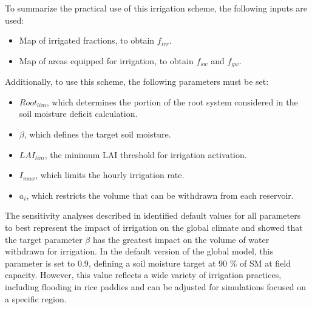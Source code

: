 To summarize the practical use of this irrigation scheme, the following inputs are used:
\begin{itemize}
    \item Map of irrigated fractions, to obtain $f_{irr}$.
    \item Map of areas equipped for irrigation, to obtain $f_{sw}$ and $f_{gw}$.
\end{itemize}

Additionally, to use this scheme, the following parameters must be set:
\begin{itemize}
    \item $Root_{lim}$, which determines the portion of the root system considered in the soil moisture deficit calculation.
    \item $\beta$, which defines the target soil moisture.
    \item $LAI_{lim}$, the minimum LAI threshold for irrigation activation.
    \item $I_{max}$, which limits the hourly irrigation rate.
    \item $a_i$, which restricts the volume that can be withdrawn from each reservoir.
\end{itemize}

The sensitivity analyses described in \citet{arboleda-obando_validation_2024} identified default values for all parameters to best represent the impact of irrigation on the global climate and showed that the target parameter $\beta$ has the greatest impact on the volume of water withdrawn for irrigation.
In the default version of the global model, this parameter is set to 0.9, defining a soil moisture target at 90 \% of SM at field capacity. However, this value reflects a wide variety of irrigation practices, including flooding in rice paddies and can be adjusted for simulations focused on a specific region. %

